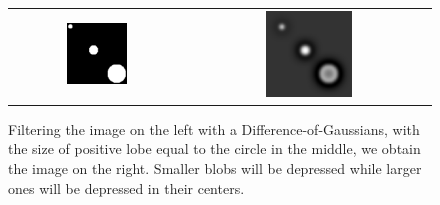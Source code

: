 \documentclass{llncs}
\begin{document}
\begin{figure}[]
  \begin{center}
    \begin{tabular}{cc}
       \includegraphics[width=0.37\textwidth]{figs/attention/dog1} &
       \includegraphics[width=0.37\textwidth]{figs/attention/dog2}
    \end{tabular}
  \end{center}
  \caption{\label{fig:multiscale}Filtering the image on the left
    with a Difference-of-Gaussians, with the size of positive lobe
    equal to the circle in the middle, we obtain the
    image on the right. Smaller blobs will be depressed while larger
    ones will be depressed in their centers.}
\end{figure}

\end{document}
